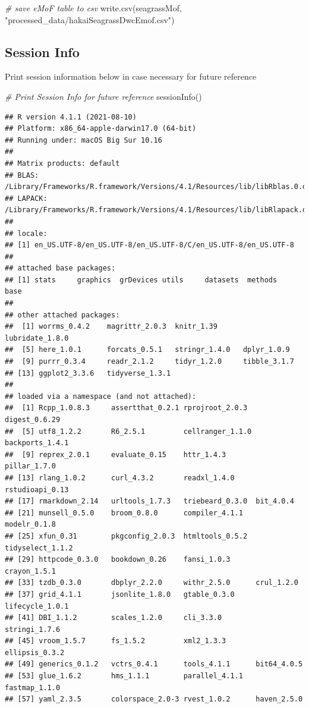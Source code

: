 \documentclass[
]{book}
\newenvironment{Shaded}{\begin{snugshade}}{\end{snugshade}}
\newcommand{\CommentTok}[1]{\textcolor[rgb]{0.56,0.35,0.01}{\textit{#1}}}
\newcommand{\FunctionTok}[1]{\textcolor[rgb]{0.00,0.00,0.00}{#1}}
\newcommand{\NormalTok}[1]{#1}
\newcommand{\StringTok}[1]{\textcolor[rgb]{0.31,0.60,0.02}{#1}}
\begin{document}
\begin{Shaded}
\begin{Highlighting}[]
\CommentTok{\# save eMoF table to csv}
\FunctionTok{write.csv}\NormalTok{(seagrassMof, }\StringTok{"processed\_data/hakaiSeagrassDwcEmof.csv"}\NormalTok{)}
\end{Highlighting}
\end{Shaded}

\hypertarget{session-info}{%
\subsection{Session Info}\label{session-info}}

Print session information below in case necessary for future reference

\begin{Shaded}
\begin{Highlighting}[]
\CommentTok{\# Print Session Info for future reference}
\FunctionTok{sessionInfo}\NormalTok{()}
\end{Highlighting}
\end{Shaded}

\begin{verbatim}
## R version 4.1.1 (2021-08-10)
## Platform: x86_64-apple-darwin17.0 (64-bit)
## Running under: macOS Big Sur 10.16
## 
## Matrix products: default
## BLAS:   /Library/Frameworks/R.framework/Versions/4.1/Resources/lib/libRblas.0.dylib
## LAPACK: /Library/Frameworks/R.framework/Versions/4.1/Resources/lib/libRlapack.dylib
## 
## locale:
## [1] en_US.UTF-8/en_US.UTF-8/en_US.UTF-8/C/en_US.UTF-8/en_US.UTF-8
## 
## attached base packages:
## [1] stats     graphics  grDevices utils     datasets  methods   base     
## 
## other attached packages:
##  [1] worrms_0.4.2    magrittr_2.0.3  knitr_1.39      lubridate_1.8.0
##  [5] here_1.0.1      forcats_0.5.1   stringr_1.4.0   dplyr_1.0.9    
##  [9] purrr_0.3.4     readr_2.1.2     tidyr_1.2.0     tibble_3.1.7   
## [13] ggplot2_3.3.6   tidyverse_1.3.1
## 
## loaded via a namespace (and not attached):
##  [1] Rcpp_1.0.8.3     assertthat_0.2.1 rprojroot_2.0.3  digest_0.6.29   
##  [5] utf8_1.2.2       R6_2.5.1         cellranger_1.1.0 backports_1.4.1 
##  [9] reprex_2.0.1     evaluate_0.15    httr_1.4.3       pillar_1.7.0    
## [13] rlang_1.0.2      curl_4.3.2       readxl_1.4.0     rstudioapi_0.13 
## [17] rmarkdown_2.14   urltools_1.7.3   triebeard_0.3.0  bit_4.0.4       
## [21] munsell_0.5.0    broom_0.8.0      compiler_4.1.1   modelr_0.1.8    
## [25] xfun_0.31        pkgconfig_2.0.3  htmltools_0.5.2  tidyselect_1.1.2
## [29] httpcode_0.3.0   bookdown_0.26    fansi_1.0.3      crayon_1.5.1    
## [33] tzdb_0.3.0       dbplyr_2.2.0     withr_2.5.0      crul_1.2.0      
## [37] grid_4.1.1       jsonlite_1.8.0   gtable_0.3.0     lifecycle_1.0.1 
## [41] DBI_1.1.2        scales_1.2.0     cli_3.3.0        stringi_1.7.6   
## [45] vroom_1.5.7      fs_1.5.2         xml2_1.3.3       ellipsis_0.3.2  
## [49] generics_0.1.2   vctrs_0.4.1      tools_4.1.1      bit64_4.0.5     
## [53] glue_1.6.2       hms_1.1.1        parallel_4.1.1   fastmap_1.1.0   
## [57] yaml_2.3.5       colorspace_2.0-3 rvest_1.0.2      haven_2.5.0
\end{verbatim}
\end{document}

